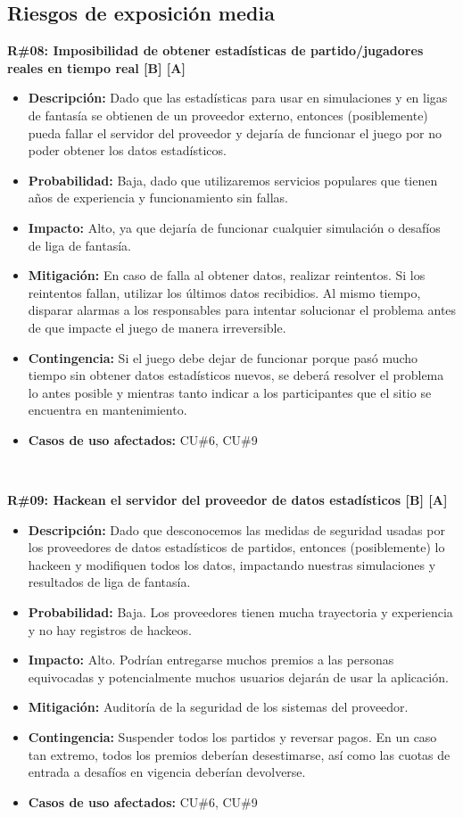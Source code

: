 \subsection{Riesgos de exposición media}

\noindent\textbf{R\#08: Imposibilidad de obtener estadísticas de partido/jugadores reales en tiempo real [B] [A] } 
\begin{itemize}
	\item{\textbf{Descripción:} Dado que las estadísticas para usar en simulaciones y en ligas de fantasía se obtienen de un proveedor externo, entonces (posiblemente) pueda fallar el servidor del proveedor y dejaría de funcionar el juego por no poder obtener los datos estadísticos.}
	\item{\textbf{Probabilidad:} Baja, dado que utilizaremos servicios populares que tienen años de experiencia y funcionamiento sin fallas.}
	\item{\textbf{Impacto:} Alto, ya que dejaría de funcionar cualquier simulación o desafíos de liga de fantasía.}
	\item{\textbf{Mitigación:} En caso de falla al obtener datos, realizar reintentos. Si los reintentos fallan, utilizar los últimos datos recibidios. Al mismo tiempo, disparar alarmas a los responsables para intentar solucionar el problema antes de que impacte el juego de manera irreversible.}
	\item{\textbf{Contingencia:} Si el juego debe dejar de funcionar porque pasó mucho tiempo sin obtener datos estadísticos nuevos, se deberá resolver el problema lo antes posible y mientras tanto indicar a los participantes que el sitio se encuentra en mantenimiento.}
	\item{\textbf{Casos de uso afectados:} CU\#6, CU\#9}
\end{itemize}

~

\noindent\textbf{R\#09: Hackean el servidor del proveedor de datos estadísticos [B] [A] } 
\begin{itemize}
	\item{\textbf{Descripción:} Dado que desconocemos las medidas de seguridad usadas por los proveedores de datos estadísticos de partidos, entonces (posiblemente) lo hackeen y modifiquen todos los datos, impactando nuestras simulaciones y resultados de liga de fantasía.}
	\item{\textbf{Probabilidad:} Baja. Los proveedores tienen mucha trayectoria y experiencia y no hay registros de hackeos.}
	\item{\textbf{Impacto:} Alto. Podrían entregarse muchos premios a las personas equivocadas y potencialmente muchos usuarios dejarán de usar la aplicación.}
	\item{\textbf{Mitigación:} Auditoría de la seguridad de los sistemas del proveedor.}
	\item{\textbf{Contingencia:} Suspender todos los partidos y reversar pagos. En un caso tan extremo, todos los premios deberían desestimarse, así como las cuotas de entrada a desafíos en vigencia deberían devolverse.}
	\item{\textbf{Casos de uso afectados:} CU\#6, CU\#9}
\end{itemize}

